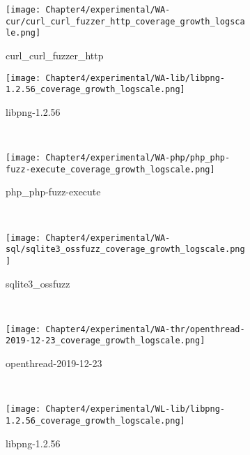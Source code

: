 \begin{figure}[!t]
    \centering
    \begin{subfigure}[t]{0.4\textwidth}
        \centering
        \texttt{[image: Chapter4/experimental/WA-cur/curl\_curl\_fuzzer\_http\_coverage\_growth\_logscale.png]}
        \vspace*{-5mm}
        \label{wa:curl:log}
        \caption{curl\_curl\_fuzzer\_http}
    \end{subfigure}
    \begin{subfigure}[t]{0.4\textwidth}
        \centering
        \texttt{[image: Chapter4/experimental/WA-lib/libpng-1.2.56\_coverage\_growth\_logscale.png]}
        \vspace*{-5mm}
        \label{wa:libpng:log}
        \caption{libpng-1.2.56}
    \end{subfigure}
    ~
    \begin{subfigure}[t]{0.4\textwidth}
        \centering
        \texttt{[image: Chapter4/experimental/WA-php/php\_php-fuzz-execute\_coverage\_growth\_logscale.png]}
        \vspace*{-5mm}
        \label{wa:php:log}
        \caption{php\_php-fuzz-execute}
    \end{subfigure}
    ~
    \begin{subfigure}[t]{0.4\textwidth}
        \centering
        \texttt{[image: Chapter4/experimental/WA-sql/sqlite3\_ossfuzz\_coverage\_growth\_logscale.png]}
        \vspace*{-5mm}
        \label{wa:sql:log}
        \caption{sqlite3\_ossfuzz}
    \end{subfigure}
    ~
    \begin{subfigure}[t]{0.4\textwidth}
        \centering
        \texttt{[image: Chapter4/experimental/WA-thr/openthread-2019-12-23\_coverage\_growth\_logscale.png]}
        \vspace*{-5mm}
        \label{wa:openthread:log}
        \caption{openthread-2019-12-23}
    \end{subfigure}
    ~
    \begin{subfigure}[t]{0.4\textwidth}
        \centering
        \texttt{[image: Chapter4/experimental/WL-lib/libpng-1.2.56\_coverage\_growth\_logscale.png]}
        \vspace*{-5mm}
        \label{wl:lib:log}
        \caption{libpng-1.2.56}
    \end{subfigure}
    ~
    \begin{subfigure}[t]{0.4\textwidth}

\end{subfigure}
\end{figure}
